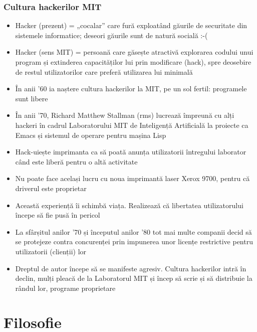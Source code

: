 \documentclass{beamer}
\begin{document}
\begin{frame}[allowframebreaks] %
\frametitle{Cultura hackerilor MIT}
\begin{itemize}

\item Hacker (prezent) = „cocalar” care fură exploatând găurile de securitate din
sistemele informatice; deseori găurile sunt de natură socială :-(
\item Hacker (sens MIT) = persoană care găsește atractivă explorarea codului
unui program și extinderea capacităților lui prin modificare (hack), spre
deosebire de restul utilizatorilor care preferă utilizarea lui minimală
\item În anii '60 ia naștere cultura hackerilor la MIT, pe un sol fertil:
programele sunt libere
\item În anii '70, Richard Matthew Stallman (rms) lucrează împreună cu alți
hackeri în cadrul Laboratorului MIT de Inteligență Artificială la proiecte ca
Emacs și sistemul de operare pentru mașina Lisp
\item Hack-uiește imprimanta ca să poată anunța utilizatorii întregului laborator
când este liberă pentru o altă activitate
\item Nu poate face același lucru cu noua imprimantă laser Xerox 9700, pentru
că driverul este proprietar
\item Această experiență îi schimbă viața. Realizează că libertatea
utilizatorului începe să fie pusă în pericol
\item La sfârșitul anilor '70 și începutul anilor '80 tot mai multe companii
decid să se protejeze contra concurenței prin impunerea unor licențe
restrictive pentru utilizatorii (clienții) lor
\item Dreptul de autor începe să se manifeste agresiv. Cultura hackerilor
intră în declin, mulți pleacă de la Laboratorul MIT și încep să scrie și să
distribuie la rândul lor, programe proprietare
\end{itemize}
\end{frame}


\section{Filosofie}
\frame{\tableofcontents[currentsection]}
\end{document}
